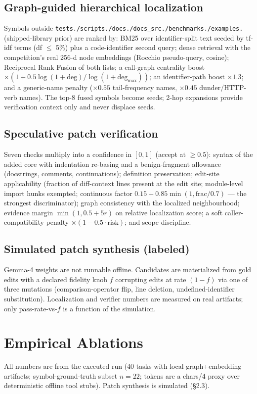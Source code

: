 \documentclass[10pt]{article}
\begin{document}
\subsection{Graph-guided hierarchical localization}
Symbols outside \texttt{tests./scripts./docs./docs\_src./benchmarks./examples.} (shipped-library prior) are ranked by: BM25 over identifier-split text seeded by tf-idf terms (df $\le$ 5\%) plus a code-identifier second query; dense retrieval with the competition's real 256-d node embeddings (Rocchio pseudo-query, cosine); Reciprocal Rank Fusion of both lists; a call-graph centrality boost $\times(1 + 0.5\log(1+\mathrm{deg})/\log(1+\mathrm{deg}_{\max}))$; an identifier-path boost $\times1.3$; and a generic-name penalty ($\times0.55$ tail-frequency names, $\times0.45$ dunder/HTTP-verb names). The top-8 fused symbols become seeds; 2-hop expansions provide verification context only and never displace seeds.

\subsection{Speculative patch verification}
Seven checks multiply into a confidence in $[0,1]$ (accept at $\ge 0.5$): syntax of the added core with indentation re-basing and a benign-fragment allowance (docstrings, comments, continuations); definition preservation; edit-site applicability (fraction of diff-context lines present at the edit site; module-level import hunks exempted; continuous factor $0.15 + 0.85\min(1,\mathrm{frac}/0.7)$ --- the strongest discriminator); graph consistency with the localized neighbourhood; evidence margin $\min(1, 0.5 + 5r)$ on relative localization score; a soft caller-compatibility penalty $\times(1 - 0.5\cdot\mathrm{risk})$; and scope discipline.

\subsection{Simulated patch synthesis (labeled)}
Gemma-4 weights are not runnable offline. Candidates are materialized from gold edits with a declared fidelity knob $f$ corrupting edits at rate $(1-f)$ via one of three mutations (comparison-operator flip, line deletion, undefined-identifier substitution). Localization and verifier numbers are measured on real artifacts; only pass-rate-vs-$f$ is a function of the simulation.

\section{Empirical Ablations}
All numbers are from the executed run (40 tasks with local graph+embedding artifacts; symbol-ground-truth subset $n=22$; tokens are a chars/4 proxy over deterministic offline tool stubs). Patch synthesis is simulated (§2.3).
\end{document}
